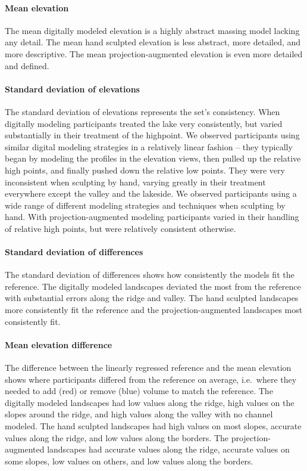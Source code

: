 \documentclass[prodmode,acmtochi]{acmsmall} %
\begin{document}
\paragraph{Mean elevation}
The mean digitally modeled elevation is a highly abstract massing model
lacking any detail. 
% 
The mean hand sculpted elevation 
is less abstract, more detailed, and more descriptive.
%
The mean projection-augmented elevation 
is even more detailed and defined. 

\paragraph{Standard deviation of elevations}
The standard deviation of elevations represents the set's consistency.
%
When digitally modeling 
participants treated the lake very consistently, but 
varied substantially in their treatment of the highpoint.
%
We observed participants 
using similar digital modeling strategies 
in a relatively linear fashion -- 
they typically began by modeling the profiles in the elevation views,
then pulled up the relative high points, 
and finally pushed down the relative low points. 
They were very inconsistent 
when sculpting by hand,
varying greatly in their treatment 
everywhere except the valley and the lakeside.
%
We observed participants using 
a wide range of different modeling strategies
and techniques
when sculpting by hand. 
%
With projection-augmented modeling 
participants varied in their handling of relative high points, 
but were relatively consistent otherwise. 

\paragraph{Standard deviation of differences}
The standard deviation of differences shows 
how consistently the models fit the reference. 
%
The digitally modeled landscapes deviated the most from the reference
with substantial errors along the ridge and valley. 
%
The hand sculpted landscapes 
more consistently fit the reference
and
the projection-augmented landscapes 
most consistently fit. 

\paragraph{Mean elevation difference}
The difference between the linearly regressed reference and the mean elevation
shows where participants 
differed from the reference on average, i.e.~where they 
needed to add (red) or remove (blue) volume to match the reference. 
%
The digitally modeled landscapes 
had low values along the ridge,
high values on the slopes around the ridge,
and high values along the valley
with no channel modeled.
% 
The hand sculpted landscapes 
had high values on most slopes,
accurate values along the ridge, 
and low values along the borders.
%
The projection-augmented landscapes 
had accurate values along the ridge,
accurate values on some slopes, 
low values on others, 
and low values along the borders.
\end{document}
